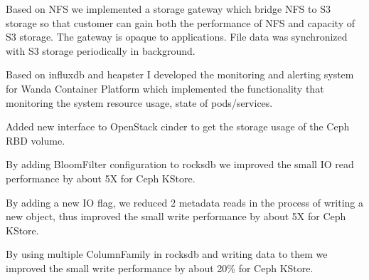 \documentclass{CurriculumVitae} %
\begin{document}


\begin{achievements}
\item Based on NFS we implemented a storage gateway which bridge NFS to S3 storage so that customer can gain both the performance of NFS and capacity of S3 storage. The gateway is opaque to applications. File data was synchronized with S3 storage periodically in background.
\item Based on influxdb and heapster I developed the monitoring and alerting system for Wanda Container Platform which implemented the functionality that monitoring the system resource usage, state of pods/services.
\item Added new interface to OpenStack cinder to get the storage usage of the Ceph RBD volume.
\end{achievements}

\begin{achievements}
\item By adding BloomFilter configuration to rocksdb we improved the small IO read performance by about 5X for Ceph KStore.
\item By adding a new IO flag, we reduced 2 metadata reads in the process of writing a new object, thus improved the small write performance by about 5X for Ceph KStore.
\item By using multiple ColumnFamily in rocksdb and writing data to them we improved the small write performance by about 20\% for Ceph KStore.
\end{achievements}
\end{document}
